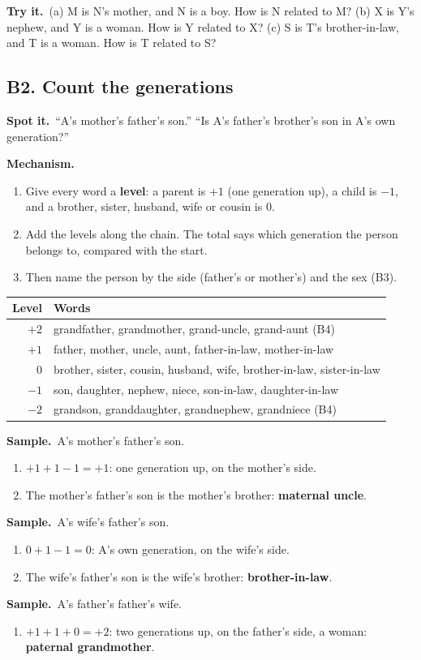 \documentclass[11pt,a4paper]{article}
\let\oldsubsection\subsection
\renewcommand{\subsection}{\needspace{9\baselineskip}\oldsubsection}
\newcommand{\spot}{\textbf{\color{ember}Spot it.}\ }
\newcommand{\mech}{\textbf{\color{ember}Mechanism.}\ }
\newif\ifkeepsamp
\newcommand{\samp}{\ifkeepsamp\needspace{4\baselineskip}\fi\textbf{\color{ember}Sample.}\ }
\newcommand{\tryit}[1]{\textbf{\color{ember}Try it.}\ #1}
\begin{document}
\tryit (a) M is N's mother, and N is a boy. How is N related to M? (b) X is Y's nephew, and Y is a woman. How is Y related to X? (c) S is T's brother-in-law, and T is a woman. How is T related to S?

\subsection{B2. Count the generations}
\spot ``A's mother's father's son.'' ``Is A's father's brother's son in A's own generation?''

\mech
\begin{enumerate}
\item Give every word a \textbf{level}: a parent is $+1$ (one generation up), a child is $-1$, and a brother, sister, husband, wife or cousin is $0$.
\item Add the levels along the chain. The total says which generation the person belongs to, compared with the start.
\item Then name the person by the side (father's or mother's) and the sex (B3).
\end{enumerate}
\begin{center}\small\renewcommand{\arraystretch}{1.18}\setlength{\tabcolsep}{8pt}
\begin{tabularx}{\linewidth}{@{}r >{\raggedright\arraybackslash}X@{}}
\toprule
\textbf{\color{slate}Level} & \textbf{\color{slate}Words} \\ \midrule
$+2$ & grandfather, grandmother, grand-uncle, grand-aunt (B4) \\
$+1$ & father, mother, uncle, aunt, father-in-law, mother-in-law \\
$0$ & brother, sister, cousin, husband, wife, brother-in-law, sister-in-law \\
$-1$ & son, daughter, nephew, niece, son-in-law, daughter-in-law \\
$-2$ & grandson, granddaughter, grandnephew, grandniece (B4) \\
\bottomrule
\end{tabularx}\end{center}

\samp A's mother's father's son.
\begin{enumerate}
\item $+1 + 1 - 1 = +1$: one generation up, on the mother's side.
\item The mother's father's son is the mother's brother: \textbf{maternal uncle}.
\end{enumerate}
\samp A's wife's father's son.
\begin{enumerate}
\item $0 + 1 - 1 = 0$: A's own generation, on the wife's side.
\item The wife's father's son is the wife's brother: \textbf{brother-in-law}.
\end{enumerate}
\samp A's father's father's wife.
\begin{enumerate}
\item $+1 + 1 + 0 = +2$: two generations up, on the father's side, a woman: \textbf{paternal grandmother}.
\end{enumerate}
\end{document}
